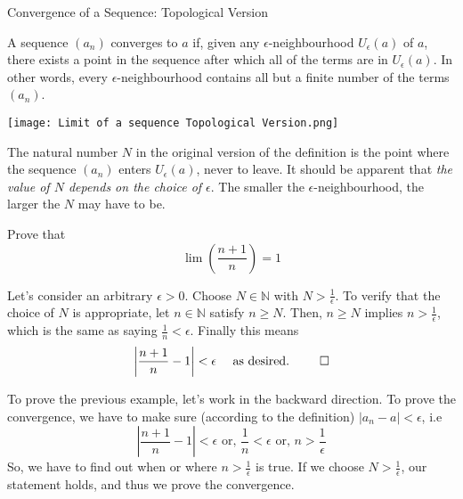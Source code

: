\begin{definition}{Convergence of a Sequence: Topological Version}
    
    A sequence $(a_n)$ converges to $a$ if, given any $\epsilon$-neighbourhood $U_\epsilon(a)$ of $a$, there exists a point in the sequence after which all of the terms are in $U_\epsilon(a)$. In other words, every $\epsilon$-neighbourhood contains all but a finite number of the terms $(a_n)$.
\end{definition}
\begin{center}
    \texttt{[image: Limit of a sequence Topological Version.png]}
\end{center} 

The natural number $N$ in the original version of the definition is the point where the sequence $(a_n)$ enters $U_\epsilon(a)$, never to leave. It should be apparent that \textit{the value of $N$ depends on the choice of $\epsilon$}. The smaller the $\epsilon$-neighbourhood, the larger the $N$ may have to be.

\begin{example}{Prove that \[ \lim \left( \frac{n+1}{n} \right) =1 \]}
    
    Let's consider an arbitrary $\epsilon>0$. Choose $N\in \mathbb{N}$ with $N>\frac{1}{\epsilon}$. To verify that the choice of $N$ is appropriate, let $n\in\mathbb{N}$ satisfy $n \ge N$. Then, $n \ge N$ implies $n>\frac{1}{\epsilon}$, which is the same as saying $\frac{1}{n}<\epsilon$. Finally this means \[
        \left| \frac{n+1}{n} - 1 \right| < \epsilon \text{ \quad as desired. } \qed
    \] 
\end{example}

\begin{note}
    
    To prove the previous example, let's work in the backward direction. To prove the convergence, we have to make sure (according to the definition) $|a_n-a|<\epsilon$, i.e \[
        \left| \frac{n+1}{n}-1 \right| < \epsilon \text{ or, } \frac{1}{n}<\epsilon \text{ or, } n>\frac{1}{\epsilon}
    \] So, we have to find out when or where $n>\frac{1}{\epsilon}$ is true. If we choose $N > \frac{1}{\epsilon}$, our statement holds, and thus we prove the convergence.
\end{note}

